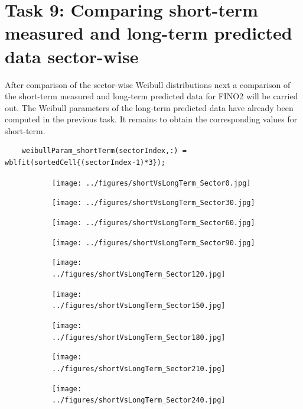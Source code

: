 \documentclass[10pt]{article}
\begin{document}
\section{Task 9: Comparing short-term measured and long-term predicted data sector-wise}
After comparison of the sector-wise Weibull distributions next a comparison of the short-term measured and long-term predicted data for FINO2 will be carried out. The Weibull parameters of the long-term predicted data have already been computed in the previous task. It remains to obtain the corresponding values for short-term. 
\begin{lstlisting}
    weibullParam_shortTerm(sectorIndex,:) = wblfit(sortedCell{(sectorIndex-1)*3});
\end{lstlisting} 

\begin{figure}[H]
\begin{subfigure}{0.3\textwidth}
  \centering
  \texttt{[image: ../figures/shortVsLongTerm\_Sector0.jpg]}
\end{subfigure}
\begin{subfigure}{0.3\textwidth}
  \centering
  \texttt{[image: ../figures/shortVsLongTerm\_Sector30.jpg]}
\end{subfigure}
\begin{subfigure}{0.3\textwidth}
  \centering
  \texttt{[image: ../figures/shortVsLongTerm\_Sector60.jpg]}
\end{subfigure}
\begin{subfigure}{0.3\textwidth}
  \centering
  \texttt{[image: ../figures/shortVsLongTerm\_Sector90.jpg]}
\end{subfigure}
\begin{subfigure}{0.3\textwidth}
  \centering
  \texttt{[image: ../figures/shortVsLongTerm\_Sector120.jpg]}
\end{subfigure}
\begin{subfigure}{0.3\textwidth}
  \centering
  \texttt{[image: ../figures/shortVsLongTerm\_Sector150.jpg]}
\end{subfigure}
\begin{subfigure}{0.3\textwidth}
  \centering
  \texttt{[image: ../figures/shortVsLongTerm\_Sector180.jpg]}
\end{subfigure}
\begin{subfigure}{0.3\textwidth}
  \centering
  \texttt{[image: ../figures/shortVsLongTerm\_Sector210.jpg]}
\end{subfigure}
\begin{subfigure}{0.3\textwidth}
  \centering
  \texttt{[image: ../figures/shortVsLongTerm\_Sector240.jpg]}

\end{subfigure}
\end{figure}
\end{document}
